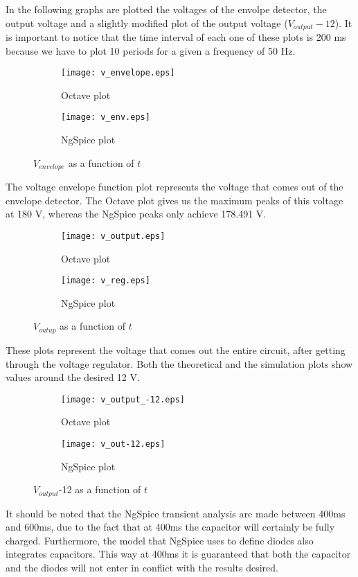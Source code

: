 In the following graphs are plotted the voltages of the envolpe detector, the output voltage and a slightly modified plot of the output voltage ($V_{output}-12$). It is important to notice that the time interval of each one of these plots is 200 ms because we have to plot 10 periods for a given a frequency of 50 Hz. 
\begin{figure}[H]
\centering
\begin{subfigure}{0.5\textwidth}
  \centering
  \texttt{[image: v\_envelope.eps]}
  \caption{Octave plot}
  \label{fig:sub1}
\end{subfigure}%
\begin{subfigure}{.5\textwidth}
  \centering
  \texttt{[image: v\_env.eps]}
  \caption{NgSpice plot}
  \label{fig:sub2}
\end{subfigure}
\caption{$V_{envelope}$ as a function of $t$}
\label{fig:test1}
\end{figure}
The voltage envelope function plot represents the voltage that comes out of the envelope detector. The Octave plot gives us the maximum peaks of this voltage at 180 V, whereas the NgSpice peaks only achieve 178.491 V.


\begin{figure}[H]
\centering
\begin{subfigure}{.5\textwidth}
  \centering
  \texttt{[image: v\_output.eps]}
  \caption{Octave plot}
  \label{fig:sub3}
\end{subfigure}%
\begin{subfigure}{.5\textwidth}
  \centering
  \texttt{[image: v\_reg.eps]}
  \caption{NgSpice plot}
  \label{fig:sub4}
\end{subfigure}
\caption{$V_{outup}$ as a function of $t$}
\label{fig:test2}
\end{figure}
These plots represent the voltage that comes out the entire circuit, after getting through the voltage regulator. Both the theoretical and the simulation plots show values around the desired 12 V.

\begin{figure}[H]
\centering
\begin{subfigure}{.5\textwidth}
  \centering
  \texttt{[image: v\_output\_-12.eps]}
  \caption{Octave plot}
  \label{fig:sub5}
\end{subfigure}%
\begin{subfigure}{.5\textwidth}
  \centering
  \texttt{[image: v\_out-12.eps]}
  \caption{NgSpice plot}
  \label{fig:sub6}
\end{subfigure}
\caption{$V_{output}$-12 as a function of $t$}
\label{fig:test3}
\end{figure}

It should be noted that the NgSpice transient analysis are made between 400ms and 600ms, due to the fact that at 400ms the capacitor will certainly be fully charged. Furthermore, the model that NgSpice uses to define diodes also integrates capacitors. This way at 400ms it is guaranteed that both the capacitor and the diodes will not enter in conflict with the results desired. 


